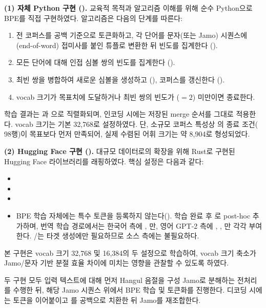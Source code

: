 \documentclass[sigconf,nonacm]{acmart}
\begin{document}
\textbf{(1) 자체 Python 구현 ().} 교육적 목적과 알고리즘 이해를 위해 순수 Python으로
BPE를 직접 구현하였다. 알고리즘은 다음의 단계를 따른다:
\begin{enumerate}
    \item 전 코퍼스를 공백 기준으로 토큰화하고, 각 단어를 문자(또는 Jamo) 시퀀스에 
    (end-of-word) 접미사를 붙인 튜플로 변환한 뒤 빈도를 집계한다 ().
    \item 모든 단어에 대해 인접 심볼 쌍의 빈도를 집계한다 ().
    \item 최빈 쌍을 병합하여 새로운 심볼을 생성하고 (),
    코퍼스를 갱신한다 ().
    \item vocab 크기가 목표치에 도달하거나 최빈 쌍의 빈도가 ($=2$) 미만이면 종료한다.
\end{enumerate}
학습 결과는 과 으로 직렬화되며, 인코딩 시에는 저장된 merge
순서를 그대로 적용한다. vocab 크기는 기본 32,768로 설정하였다. 단, 소규모 코퍼스 특성상
의 종료 조건( 98행)이  목표보다 먼저
만족되어, 실제 수렴된 어휘 크기는 약 8{,}904로 형성되었다.

\textbf{(2) Hugging Face 구현 ().} 대규모 데이터로의 확장을 위해 Rust로 구현된
Hugging Face  라이브러리를 래핑하였다. 핵심 설정은 다음과 같다:
\begin{itemize}
    \item {}
    \item {}
    \item {}
    \item BPE 학습 자체에는 특수 토큰을 등록하지 않는다(). 학습 완료 후
    로 post-hoc 추가하며, 번역 학습 경로에서는 한국어 측에
    , 만, 영어 GPT-2 측에 , , 만
    각각 부여한다. /는 타겟 생성에만 필요하므로 소스 측에는 불필요하다.
\end{itemize}
본 구현은 vocab 크기 32,768 및 16,384의 두 설정으로 학습하여, vocab 크기 축소가
Jamo/문자 기반 분절 효율 차이에 미치는 영향을 관찰할 수 있도록 하였다.

두 구현 모두 입력 텍스트에 대해 먼저 Hangul 음절을 구성 Jamo로 분해하는 전처리를 수행한 뒤,
해당 Jamo 시퀀스 위에서 BPE 학습 및 토큰화를 진행한다. 디코딩 시에는 토큰을 이어붙이고
를 공백으로 치환한 뒤 Jamo를 재조합한다.
\end{document}
